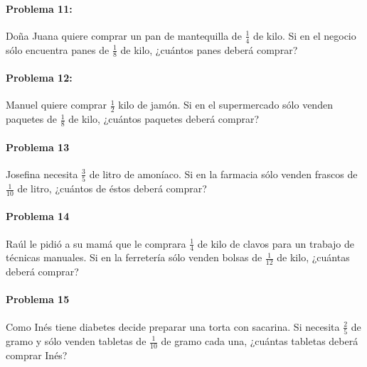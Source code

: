 \documentclass[10pt,twoside]{article}
\begin{document}
\paragraph*{Problema 11:}
Doña Juana quiere comprar un pan de mantequilla de $\frac{1} {4}$ de kilo. Si en el negocio sólo encuentra panes de $\frac{1}{8}$ de kilo, ¿cuántos panes deberá comprar?
\paragraph*{Problema 12:}
Manuel quiere comprar $\frac{1}{2}$ kilo de jamón. Si en el supermercado sólo venden paquetes de $\frac{1}{8}$ de kilo, ¿cuántos paquetes deberá comprar?
\paragraph*{Problema 13}
Josefina necesita $\frac{3}{5}$ de litro de amoníaco. Si en la farmacia sólo venden frascos de $\frac{1}{10}$ de litro, ¿cuántos de éstos deberá comprar?
\paragraph*{Problema 14}
Raúl le pidió a su mamá que le comprara $\frac{1}{4}$ de kilo de clavos para un trabajo de técnicas manuales. Si en la ferretería sólo venden bolsas de $\frac{1}{12}$ de kilo, ¿cuántas deberá comprar?
\paragraph*{Problema 15}
Como Inés tiene diabetes decide preparar una torta con sacarina. Si necesita $\frac{2}{5}$ de gramo y sólo venden tabletas de $\frac{1}{10}$ de gramo cada una, ¿cuántas tabletas deberá comprar Inés?
\end{document}
